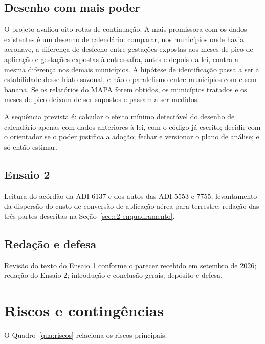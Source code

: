 \subsection{Desenho com mais poder}

O projeto avaliou oito rotas de continuação. A mais promissora com os dados
existentes é um desenho de calendário: comparar, nos municípios onde havia
aeronave, a diferença de desfecho entre gestações expostas aos meses de pico de
aplicação e gestações expostas à entressafra, antes e depois da lei, contra a
mesma diferença nos demais municípios. A hipótese de identificação passa a ser
a estabilidade desse hiato sazonal, e não o paralelismo entre municípios com e
sem banana. Se os relatórios do MAPA forem obtidos, os municípios tratados e os
meses de pico deixam de ser supostos e passam a ser medidos.

 A sequência prevista é: calcular
o efeito mínimo detectável do desenho de calendário apenas com dados anteriores
à lei, com o código já escrito; decidir com o orientador se o poder justifica a
adoção; fechar e versionar o plano de análise; e só então estimar.

\subsection{Ensaio 2}

Leitura do acórdão da ADI 6137 e dos autos das ADI 5553 e 7755; levantamento da
dispersão do custo de conversão de aplicação aérea para terrestre; redação das
três partes descritas na Seção~\ref{sec:e2-enquadramento}.

\subsection{Redação e defesa}

Revisão do texto do Ensaio 1 conforme o parecer recebido em setembro de 2026;
redação do Ensaio 2; introdução e conclusão gerais; depósito e defesa.

\section{Riscos e contingências}
\label{sec:riscos}

O Quadro~\ref{qua:riscos} relaciona os riscos principais.

